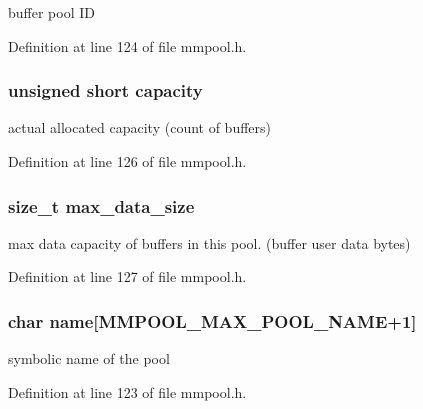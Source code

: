 buffer pool I\-D 



Definition at line 124 of file mmpool.\-h.

\hypertarget{struct__bpmf__stats_a05ec8f5accddd579c000a50a6bfc80d2}{
\subsubsection[{capacity}]{\setlength{\rightskip}{0pt plus 5cm}unsigned short capacity}}\label{struct__bpmf__stats_a05ec8f5accddd579c000a50a6bfc80d2}


actual allocated capacity (count of buffers) 



Definition at line 126 of file mmpool.\-h.

\hypertarget{struct__bpmf__stats_a1fc8222b39b9e50ce780d8ec0205b972}{
\subsubsection[{max\-\_\-data\-\_\-size}]{\setlength{\rightskip}{0pt plus 5cm}size\-\_\-t max\-\_\-data\-\_\-size}}\label{struct__bpmf__stats_a1fc8222b39b9e50ce780d8ec0205b972}


max data capacity of buffers in this pool. (buffer user data bytes) 



Definition at line 127 of file mmpool.\-h.

\hypertarget{struct__bpmf__stats_a56cac4709d8dcdd7d7d40d2261606d10}{
\subsubsection[{name}]{\setlength{\rightskip}{0pt plus 5cm}char name\mbox{[}{\bf M\-M\-P\-O\-O\-L\-\_\-\-M\-A\-X\-\_\-\-P\-O\-O\-L\-\_\-\-N\-A\-M\-E}+1\mbox{]}}}\label{struct__bpmf__stats_a56cac4709d8dcdd7d7d40d2261606d10}


symbolic name of the pool 



Definition at line 123 of file mmpool.\-h.

